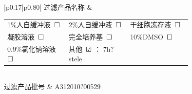 \documentclass[UTF8,10pt,a4paper,fontset=fandol]{ctexart}
\newcommand{\fieldvalue}[1]{#1}
\newcommand{\handwritten}[1]{#1}
\newcommand{\checkboxfield}[1]{\ifstrequal{#1}{checked}{☑}{\ifstrequal{#1}{unclear}{?}{☐}}}
\begin{document}
\vspace{2pt}
\begin{tabular}{|p{0.17\linewidth}|p{0.80\linewidth}|}
\hline
过滤产品名称 &
\begin{tabular}{p{0.25\linewidth}p{0.25\linewidth}p{0.25\linewidth}}
1\%人自缓冲液\,%
\fieldvalue{\checkboxfield{unchecked}}
&
2\%人自缓冲液\,%
\fieldvalue{\checkboxfield{unchecked}}
&
干细胞冻存液\,%
\fieldvalue{\checkboxfield{unchecked}}
\\
凝胶溶液\,%
\fieldvalue{\checkboxfield{unchecked}}
&
完全培养基\,%
\fieldvalue{\checkboxfield{unchecked}}
&
10\%DMSO\,%
\fieldvalue{\checkboxfield{unchecked}}
\\
0.9\%氯化钠溶液\,%
\fieldvalue{\checkboxfield{unchecked}}
&
其他\,%
\fieldvalue{\checkboxfield{checked}}
：
\fieldvalue{\handwritten{7h?stele}}
&
\end{tabular}
\\ \hline
过滤产品批号 &
\fieldvalue{\handwritten{A312010?00529}} \\ \hline
\end{tabular}
\end{document}
